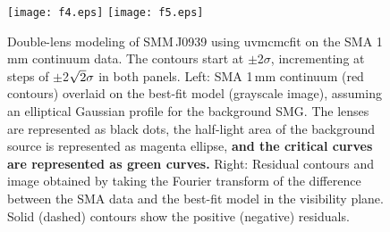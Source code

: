 \documentclass[iop]{emulateapj}
\begin{document}

\begin{figure}[!tbpH]
\centering
\texttt{[image: f4.eps]}
\texttt{[image: f5.eps]}
\caption{Double-lens modeling of SMM\,J0939 using {\sc uvmcmcfit} on the SMA 1\,mm continuum data.
The contours start at $\pm$2$\sigma$, incrementing at
steps of $\pm$2$\sqrt{\rm 2}\sigma$ in both panels. Left: SMA 1\,mm continuum (red contours) overlaid on the best-fit model (grayscale image), assuming an elliptical Gaussian profile for the background SMG. The lenses are represented as black dots, the half-light area of the background source is represented as magenta ellipse, {\bf and the critical curves are represented as green curves.}
Right: Residual contours and image obtained by taking the Fourier transform of the difference between the SMA data and the best-fit model in the visibility plane. Solid (dashed) contours show the positive (negative) residuals.\label{fig:lens}}
\end{figure}
\end{document}
